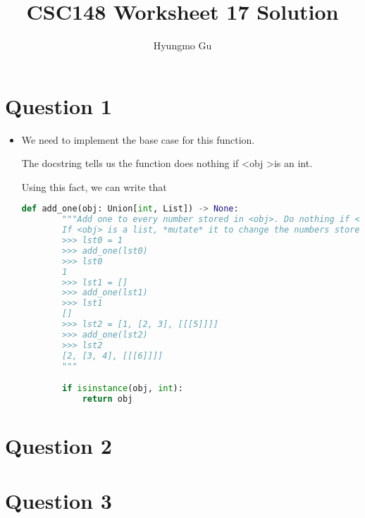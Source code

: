 \documentclass[12pt]{article}
\begin{document}
\title{CSC148 Worksheet 17 Solution}
\author{Hyungmo Gu}
\maketitle

\section*{Question 1}
\begin{itemize}
    \item

    We need to implement the base case for this function.

    \bigskip

    The docstring tells us the function does nothing if \textless obj \textgreater is an int.

    \bigskip

    Using this fact, we can write that

    \bigskip

    \begin{lstlisting}[language=python,caption={worksheet\_17\_q1\_solution.py}]
    def add_one(obj: Union[int, List]) -> None:
        """Add one to every number stored in <obj>. Do nothing if <obj> is an int.
        If <obj> is a list, *mutate* it to change the numbers stored.
        >>> lst0 = 1
        >>> add_one(lst0)
        >>> lst0
        1
        >>> lst1 = []
        >>> add_one(lst1)
        >>> lst1
        []
        >>> lst2 = [1, [2, 3], [[[5]]]]
        >>> add_one(lst2)
        >>> lst2
        [2, [3, 4], [[[6]]]]
        """

        if isinstance(obj, int):
            return obj
    \end{lstlisting}
\end{itemize}

\section*{Question 2}

\section*{Question 3}
\end{document}
